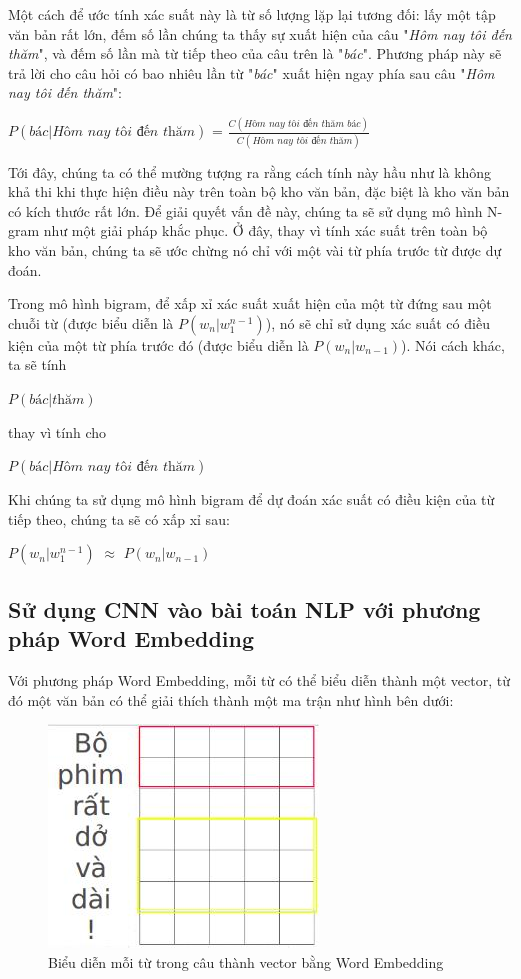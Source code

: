 Một cách để ước tính xác suất này là từ số lượng lặp lại tương đối: lấy một tập văn bản rất lớn, đếm số lần chúng ta thấy sự xuất hiện của câu "\textit{Hôm nay tôi đến thăm}", và đếm số lần mà từ tiếp theo của câu trên là "\textit{bác}". Phương pháp này sẽ trả lời cho câu hỏi có bao nhiêu lần từ "\textit{bác}" xuất hiện ngay phía sau câu "\textit{Hôm nay tôi đến thăm}":
\begin{center}
    $P(\textit{bác} | \textit{Hôm nay tôi đến thăm})$ = 
    $\frac{C(\textit{Hôm nay tôi đến thăm bác})}{C(\textit{Hôm nay tôi đến thăm})}$
\end{center}

Tới đây, chúng ta có thể mường tượng ra rằng cách tính này hầu như là không khả thi khi thực hiện điều này trên toàn bộ kho văn bản, đặc biệt là kho văn bản có kích thước rất lớn. Để giải quyết vấn đề này, chúng ta sẽ sử dụng mô hình N-gram như một giải pháp khắc phục. Ở đây, thay vì tính xác suất trên toàn bộ kho văn bản, chúng ta sẽ ước chừng nó chỉ với một vài từ phía trước từ được dự đoán.

Trong mô hình bigram, để xấp xỉ xác suất xuất hiện của một từ đứng sau một chuỗi từ (được biểu diễn là $P(w_{n}|w^{n-1}_{1})$), nó sẽ chỉ sử dụng xác suất có điều kiện của một từ phía trước đó (được biểu diễn là $P(w_{n}|w_{n-1})$). Nói cách khác, ta sẽ tính
\begin{center}
    $P(\textit{bác} | \textit{thăm})$
\end{center}

thay vì tính cho
\begin{center}
    $P(\textit{bác} | \textit{Hôm nay tôi đến thăm})$
\end{center}

Khi chúng ta sử dụng mô hình bigram để dự đoán xác suất có điều kiện của từ tiếp theo, chúng ta sẽ có xấp xỉ sau:
\begin{center}
     $P(w_{n}|w^{n-1}_{1})$ $\approx$  $P(w_{n}|w_{n-1})$
\end{center}

\subsection{Sử dụng CNN vào bài toán NLP với phương pháp Word Embedding}
Với phương pháp Word Embedding, mỗi từ có thể biểu diễn thành một vector, từ đó một văn bản có thể giải thích thành một ma trận như hình bên dưới:
\begin{figure}[!h]
	\centering
		\includegraphics[width=0.3\columnwidth]{chapter05/figure/convolution-example-8.jpg}
        \caption{Biểu diễn mỗi từ trong câu thành vector bằng Word Embedding}
        \label{fig:convolutionexample8}
\end{figure}

